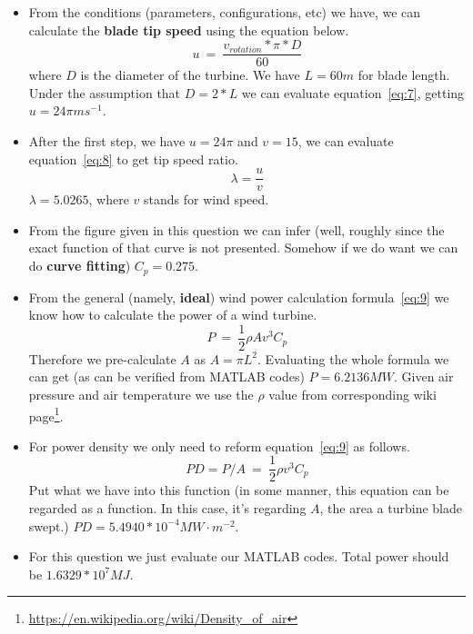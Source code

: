 \documentclass[12pt]{article}
\begin{document}
\begin{itemize}
\item From the conditions (parameters, configurations, etc) we have,
  we can calculate the \textbf{blade tip speed} using the equation
  below.
  \begin{equation}
    \label{eq:7}
    u~=~\frac{v_{rotation}*\pi*D}{60}
  \end{equation}
  where $D$ is the diameter of the turbine. We have $L=60m$ for blade
  length. Under the assumption that $D=2*L$ we can evaluate
  equation~\eqref{eq:7}, getting $u=24\pi ms^{-1}$.
\item After the first step, we have $u=24\pi$ and $v=15$, we can
  evaluate equation~\eqref{eq:8} to get tip speed ratio.
  \begin{equation}
    \label{eq:8}
    \lambda=\frac{u}{v}
  \end{equation}
  $\lambda=5.0265$, where $v$ stands for wind speed.
\item From the figure given in this question we can infer (well,
  roughly since the exact function of that curve is not
  presented. Somehow if we do want we can do \textbf{curve fitting})
  $C_{p}=0.275$.
\item From the general (namely, \textbf{ideal}) wind power calculation
  formula~\eqref{eq:9} we know how to calculate the power of a wind
  turbine.
  \begin{equation}
    \label{eq:9}
    P~=~\frac{1}{2}\rho Av^{3}C_{p}
  \end{equation}
  Therefore we pre-calculate $A$ as $A=\pi L^{2}$. Evaluating the
  whole formula we can get (as can be verified from MATLAB codes)
  $P=6.2136MW$. Given air pressure and air temperature we use the
  $\rho$ value from corresponding wiki
  page\footnote{\url{https://en.wikipedia.org/wiki/Density_of_air}}. 
\item For power density we only need to reform equation~\eqref{eq:9}
  as follows.
  \begin{equation}
    \label{eq:10}
    PD=P/A~=~\frac{1}{2}\rho v^{3}C_{p}
  \end{equation}
  Put what we have into this function (in some manner, this equation
  can be regarded as a function. In this case, it's regarding $A$, the
  area a turbine blade swept.) $PD=5.4940*10^{-4}MW\cdot m^{-2}$.
\item For this question we just evaluate our MATLAB codes. Total power
  should be $1.6329*10^{7}MJ$.
\end{itemize}
\end{document}
